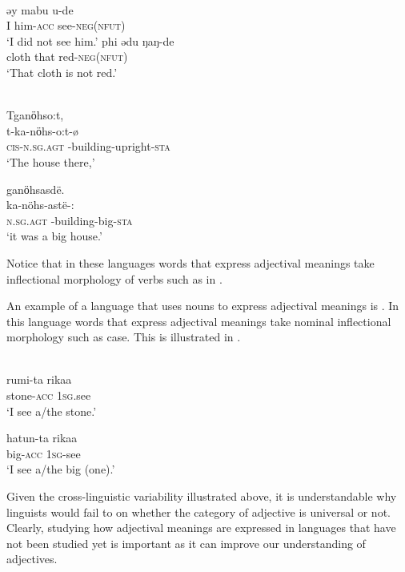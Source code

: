 \documentclass[output=paper,
modfonts
]{langscibook}
\begin{document}
\ea\label{ex:wasike:1}
\ea
{}\\
\gll ǝy mabu u-de\\
     I him-\textsc{acc} see-\textsc{neg}(\textsc{nfut})\\
\glt ‘I did not see him.’
\ex
\gll  phi    ǝdu    ŋaŋ-de\\
     cloth  that   red-\textsc{neg}(\textsc{nfut})\\
\glt ‘That cloth is not red.’
\z
\z

\ea\label{ex:wasike:2}
\ea
{}\\
\gll Tganӧhso:t,\\
     t-ka-nӧhs-o:t-ø\\
     \textsc{cis}-\textsc{n.sg.agt} -building-upright-\textsc{sta}\\
\glt ‘The house there,’
\ex

\gll  ganӧhsasdë.\\
     ka-nöhs-astë-:\\
     \textsc{n.sg.agt} -building-big-\textsc{sta}\\
\glt ‘it was a big house.’
\z
\z

Notice that in these languages words that express adjectival meanings take inflectional morphology of verbs such as  in .

An example of a language that uses nouns to express adjectival meanings is . In this language words that express adjectival meanings take nominal inflectional morphology such as case. This is illustrated in .

\ea\label{ex:wasike:3}
\ea
{}\\
\gll rumi-ta rikaa\\
     stone-\textsc{acc}  \textsc{1sg}.see\\
\glt ‘I see a/the stone.’
\ex

\gll  hatun-ta rikaa\\
     big-\textsc{acc} \textsc{1sg}-see\\
\glt ‘I see a/the big (one).’
\z
\z

Given the cross-linguistic variability illustrated above, it is understandable why linguists would fail to  on whether the category of adjective is universal or not. Clearly, studying how adjectival meanings are expressed in languages that have not been studied yet is important as it can improve our understanding of adjectives. 
\end{document}
